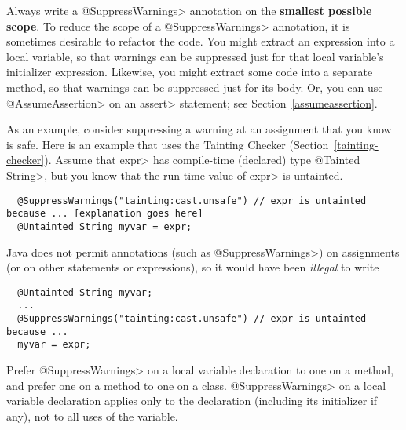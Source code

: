 Always write a \<@SuppressWarnings> annotation on the \textbf{smallest possible
scope}.  To reduce the scope of a \<@SuppressWarnings> annotation, it is
sometimes desirable to refactor the code.  You might extract an expression
into a local variable, so that warnings can be suppressed just for that
local variable's initializer expression.  Likewise, you might extract some
code into a separate method, so that warnings can be suppressed just for
its body.  Or, you can use \<@AssumeAssertion> on an \<assert> statement;
see Section~\ref{assumeassertion}.

As an example, consider suppressing a warning at an assignment that you know is
safe.  Here is an example that uses the Tainting Checker
(Section~\ref{tainting-checker}).  Assume that \<expr> has compile-time
(declared) type \<@Tainted String>, but you know that the run-time value of
\<expr> is untainted.

\begin{smaller}
\begin{Verbatim}
  @SuppressWarnings("tainting:cast.unsafe") // expr is untainted because ... [explanation goes here]
  @Untainted String myvar = expr;
\end{Verbatim}
\end{smaller}

\noindent
Java does not permit annotations (such as \<@SuppressWarnings>) on
assignments (or on other statements or expressions), so
it would have been \emph{illegal} to write

\begin{smaller}
\begin{Verbatim}
  @Untainted String myvar;
  ...
  @SuppressWarnings("tainting:cast.unsafe") // expr is untainted because ...
  myvar = expr;
\end{Verbatim}
\end{smaller}




Prefer \<@SuppressWarnings> on a local variable declaration to one on a method, and
prefer one on a method to one on a class.
\<@SuppressWarnings> on a local variable declaration applies only to the
declaration (including its initializer if any), not to all uses of the variable.

